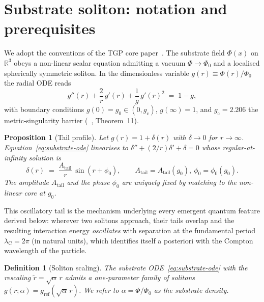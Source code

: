 \documentclass[11pt,a4paper]{article}
\renewcommand{\Phi}{\varPhi}
\newcommand{\PhiZero}{\varPhi_{0}}
\newcommand{\Atail}{A_{\mathrm{tail}}}
\newcommand{\gcrit}{g_{\mathrm{c}}}
\newtheorem{proposition}[theorem]{Proposition}
\newtheorem{definition}[theorem]{Definition}
\begin{document}
\section{Substrate soliton: notation and prerequisites}\label{sec:soliton}

We adopt the conventions of the TGP core paper~\cite{TGP-core}. The
substrate field $\Phi(x)$ on $\mathbb{R}^{3}$ obeys a non-linear scalar
equation admitting a vacuum $\Phi\to\PhiZero$ and a localised
spherically symmetric soliton. In the dimensionless variable
$g(r)\equiv\Phi(r)/\PhiZero$ the radial ODE reads~\cite{TGP-core}
\begin{equation}\label{eq:substrate-ode}
  g''(r)+\frac{2}{r}\,g'(r)+\frac{1}{g}\,g'(r)^{2} \;=\; 1-g,
\end{equation}
with boundary conditions $g(0)=g_{0}\in(0,\gcrit)$,
$g(\infty)=1$, and $\gcrit=2.206$ the metric-singularity barrier
(~\cite{TGP-core}, Theorem~11).

\begin{proposition}[Tail profile]\label{prop:tail}
Let $g(r)=1+\delta(r)$ with $\delta\to 0$ for $r\to\infty$.
Equation~\eqref{eq:substrate-ode} linearises to $\delta''+(2/r)\delta'+\delta=0$
whose regular-at-infinity solution is
\begin{equation}\label{eq:tail}
  \delta(r) \;=\; \frac{\Atail}{r}\,\sin(r+\phi_{0}),
  \qquad \Atail=\Atail(g_{0}),\ \phi_{0}=\phi_{0}(g_{0}).
\end{equation}
The amplitude $\Atail$ and the phase $\phi_{0}$ are uniquely fixed by
matching to the non-linear core at $g_{0}$.
\end{proposition}

This oscillatory tail is the mechanism underlying every emergent
quantum feature derived below: wherever two solitons approach, their
tails overlap and the resulting interaction energy
\emph{oscillates} with separation at the fundamental period
$\lambda_{\mathrm{C}}=2\pi$ (in natural units), which identifies
itself a posteriori with the Compton wavelength of the particle.

\begin{definition}[Soliton scaling]\label{def:scaling}
The substrate ODE~\eqref{eq:substrate-ode} with the rescaling
$\tilde r=\sqrt{\alpha}\,r$ admits a one-parameter family of solitons
$g(r;\alpha)=g_{\mathrm{ref}}(\sqrt{\alpha}\,r)$. We refer to
$\alpha=\Phi/\PhiZero$ as the substrate density.
\end{definition}
\end{document}
